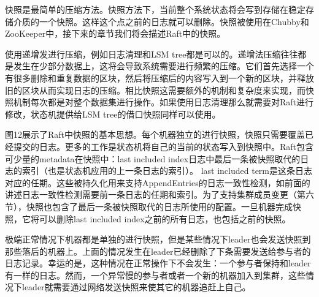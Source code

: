 \documentclass[journal]{IEEEtran}
\begin{document}
快照是最简单的压缩方法。快照方法下，当前整个系统状态将会写到存储在稳定存储介质的一个快照。这样这个点之前的日志就可以删除。快照被使用在Chubby和ZooKeeper中，接下来的章节我们将会描述Raft中的快照。

使用递增发进行压缩，例如日志清理和LSM tree都是可以的。递增法压缩往往都是发生在少部分数据上，这将会导致系统需要进行频繁的压缩。它们首先选择一个有很多删除和重复数据的区块，然后将压缩后的内容写入到一个新的区块，并释放旧的区块从而实现日志的压缩。相比快照这需要额外的机制和复杂度来实现，而快照机制每次都是对整个数据集进行操作。如果使用日志清理那么就需要对Raft进行修改，状态机提供给LSM tree的借口快照同样可以使用。

图12展示了Raft中快照的基本思想。每个机器独立的进行快照，快照只需要覆盖已经提交的日志。更多的工作是状态机将自己的当前的状态写入到快照中。Raft包含可少量的metadata在快照中：last included index日志中最后一条被快照取代的日志的索引（也是状态机应用的上一条日志的索引）。 last included term是这条日志对应的任期。这些被持久化用来支持AppendEntries的日志一致性检测，如前面的讲述日志一致性检测需要前一条日志的任期和索引。为了支持集群成员变更（第六节），快照也包含了最后一条被快照取代的日志所使用的配置。一旦机器完成快照，它将可以删除last included index之前的所有日志，也包括之前的快照。


极端正常情况下机器都是单独的进行快照，但是某些情况下leader也会发送快照到那些落后的机器上。上面的情况发生在leader已经删除了下条需要发送给参与者的日志记录。幸运的是，这种情况在正常操作下不会发生：一个参与者保持和leader有一样的日志。然而，一个异常慢的参与者或者一个新的机器加入到集群，这些情况下leader就需要通过网络发送快照来使其它的机器追赶上自己。
\end{document}

